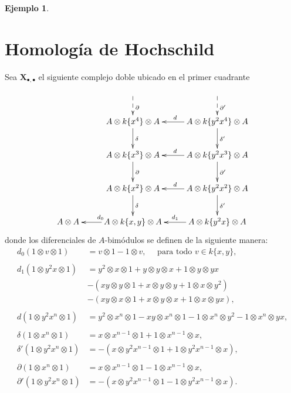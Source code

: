 \documentclass[a4paper,oneside,fleqn,11pt]{report}
\newcommand\ox{\otimes}
\theoremstyle{definition}
\theoremstyle{definition}
\newtheorem{example}{Ejemplo}[section]
\numberwithin{prop}{subsection}
\begin{document}
\begin{example}
\section{Homología de Hochschild}
Sea $\mathbf{X}_{\bullet,\bullet}$ el siguiente complejo doble ubicado en el primer cuadrante
\begin{align*}
\xymatrix{
	& & \\
	& A \ox k\{x^4\} \ox A \ar[d]^{\delta} \ar@{<--}[u]_{\partial} & A \ox k\{y^2x^4\} \ox A \ar[l]_d \ar[d]^{\delta'} \ar@{<--}[u]_{\partial'} \\
	& A \ox k\{x^3\} \ox A \ar[d]^{\partial} & A \ox k\{y^2x^3\} \ox A \ar[l]_d \ar[d]^{\partial'} \\
	& A \ox k\{x^2\} \ox A \ar[d]^{\delta} & A \ox k \{y^2x^2\} \ox A \ar[l]_d \ar[d]^{\delta'} \\
	A \ox A & A \ox k\{x, y\} \ox A \ar[l]_{d_0} & A \ox k \{y^2x\} \ox A \ar[l]_{d_1} \\
}
\end{align*}
donde los diferenciales de $A$-bimódulos se definen de la siguiente manera:
\begin{align*}
	d_0(1 \ox v \ox 1) &= v \ox 1 - 1 \ox v, \quad\text{ para todo } v \in k\{x, y\}, \\
	\\
	d_1(1 \ox y^2x \ox 1) &= y^2 \ox x \ox 1 + y \ox y \ox x + 1 \ox y \ox yx \\
		&-(xy \ox y \ox 1 + x \ox y \ox y + 1 \ox x \ox y^2) \\
		&-(xy \ox x \ox 1 + x \ox y \ox x + 1 \ox x \ox yx), \\
	\\	
	d(1 \ox y^2x^n \ox 1) &= y^2 \ox x^n \ox 1 - xy \ox x^n \ox 1 - 1 \ox x^n \ox y^2 - 1 \ox x^n \ox yx,\\
	\\	
	\delta(1 \ox x^n \ox 1) &= x \ox x^{n -1} \ox 1 + 1 \ox x^{n - 1} \ox x,\\
	\delta'(1 \ox y^2x^n \ox 1) &= - (x \ox y^2 x^{n -1} \ox 1 + 1 \ox y^2x^{n - 1} \ox x),\\
	\\	
	\partial(1 \ox x^n \ox 1) &= x \ox x^{n -1} \ox 1 - 1 \ox x^{n - 1} \ox x,\\
	\partial'(1 \ox y^2x^n \ox 1) &= -(x \ox y^2 x^{n -1} \ox 1 - 1 \ox y^2x^{n - 1} \ox x). \\
\end{align*}


\end{example}
\end{document}
